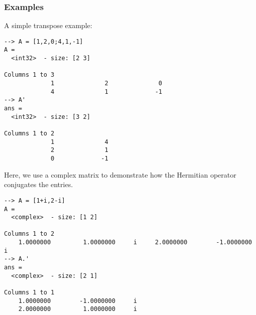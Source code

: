 \subsubsection{Examples}
A simple transpose example:
\begin{verbatim}
--> A = [1,2,0;4,1,-1]
A =
  <int32>  - size: [2 3]
  
Columns 1 to 3
             1              2              0
             4              1             -1
--> A'
ans =
  <int32>  - size: [3 2]
  
Columns 1 to 2
             1              4
             2              1
             0             -1
\end{verbatim}
Here, we use a complex matrix to demonstrate how the Hermitian operator conjugates the entries.
\begin{verbatim}
--> A = [1+i,2-i]
A =
  <complex>  - size: [1 2]
  
Columns 1 to 2
    1.0000000         1.0000000     i     2.0000000        -1.0000000     i
--> A.'
ans =
  <complex>  - size: [2 1]
  
Columns 1 to 1
    1.0000000        -1.0000000     i
    2.0000000         1.0000000     i
\end{verbatim}
